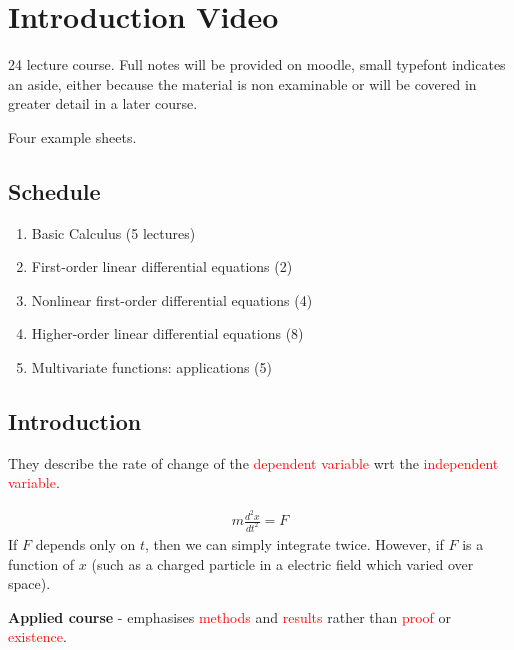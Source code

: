 \setcounter{section}{-1}

\hypertarget{introduction-video}{%
\section{Introduction Video}\label{introduction-video}}

24 lecture course. 
Full notes will be provided on moodle, small typefont indicates an aside, either because the material is non examinable or will be covered in greater detail in a later course.

Four example sheets.

\hypertarget{schedule}{%
\subsection{Schedule}\label{schedule}}

\begin{enumerate}
\def\labelenumi{\arabic{enumi}.}
\tightlist
\item
  Basic Calculus (5 lectures)
\item
  First-order linear differential equations (2)
\item
  Nonlinear first-order differential equations (4)
\item
  Higher-order linear differential equations (8)
\item
  Multivariate functions: applications (5)
\end{enumerate}

\hypertarget{introduction}{%
\subsection{Introduction}\label{introduction}}

They describe the rate of change of the \textcolor{red}{dependent variable} wrt the \textcolor{red}{independent variable}.

\begin{example}
\begin{align*}
  m \frac{d^2 x}{d t^2} = F
\end{align*}
If \(F\) depends only on \(t\), then we can simply integrate twice. However, if \(F\) is a function of \(x\) (such as a charged particle in a electric field which varied over space).
\end{example}

\textbf{Applied course} - emphasises \textcolor{red}{methods} and \textcolor{red}{results} rather than \textcolor{red}{proof} or \textcolor{red}{existence}.

